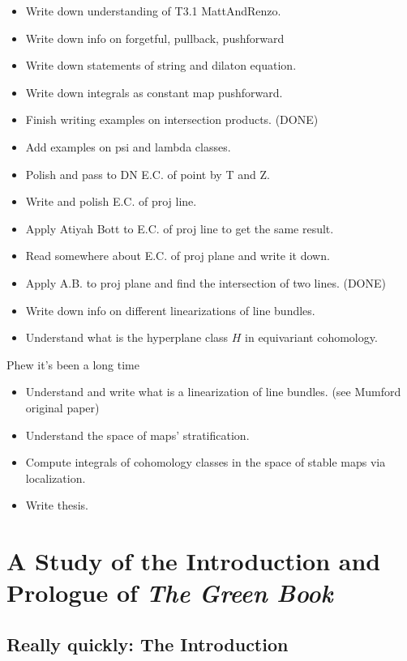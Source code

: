 \documentclass[12pt]{memoir}
\begin{document}
{\begin{itemize}
    \item Write down understanding of T3.1 MattAndRenzo.
    \item Write down info on forgetful, pullback, pushforward
    \item Write down statements of string and dilaton equation.
    \item Write down integrals as constant map pushforward.
\end{itemize}
\begin{itemize}
    \item Finish writing examples on intersection products. (DONE)
    \item Add examples on psi and lambda classes.
    \item Polish and pass to DN E.C. of point by T and Z. 
    \item Write and polish E.C. of proj line. 
    \item Apply Atiyah Bott to E.C. of proj line to get the same result. 
    \item Read somewhere about E.C. of proj plane and write it down.
    \item Apply A.B. to proj plane and find the intersection of two lines. (DONE)
    \item Write down info on different linearizations of line bundles.
    \item Understand what is the hyperplane class $H$ in equivariant cohomology.
\end{itemize}
Phew it's been a long time
\begin{itemize}
    \item Understand and write what is a linearization of line bundles. (see Mumford original paper)
    \item Understand the space of maps' stratification.
    \item Compute integrals of cohomology classes in the space of stable maps via localization.
    \item Write thesis.
\end{itemize}
}
\newpage
\tableofcontents
\chapter{A Study of the Introduction and Prologue of \emph{The Green Book}}

\section{Really quickly: The Introduction}
\end{document}
